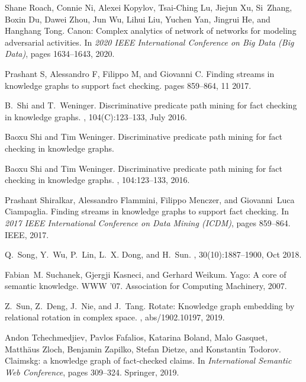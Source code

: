 \documentclass[11pt]{article}
\begin{document}
\begin{thebibliography}{10}
Shane Roach, Connie Ni, Alexei Kopylov, Tsai-Ching Lu, Jiejun Xu, Si~Zhang,
  Boxin Du, Dawei Zhou, Jun Wu, Lihui Liu, Yuchen Yan, Jingrui He, and Hanghang
  Tong.
\newblock Canon: Complex analytics of network of networks for modeling
  adversarial activities.
\newblock In {\em 2020 IEEE International Conference on Big Data (Big Data)},
  pages 1634--1643, 2020.

Prashant S, Alessandro F, Filippo M, and Giovanni C.
\newblock Finding streams in knowledge graphs to support fact checking.
\newblock pages 859--864, 11 2017.

B.~Shi and T.~Weninger.
\newblock Discriminative predicate path mining for fact checking in knowledge
  graphs.
, 104(C):123--133, July 2016.

Baoxu Shi and Tim Weninger.
\newblock Discriminative predicate path mining for fact checking in knowledge
  graphs.

Baoxu Shi and Tim Weninger.
\newblock Discriminative predicate path mining for fact checking in knowledge
  graphs.
, 104:123--133, 2016.

Prashant Shiralkar, Alessandro Flammini, Filippo Menczer, and Giovanni~Luca
  Ciampaglia.
\newblock Finding streams in knowledge graphs to support fact checking.
\newblock In {\em 2017 IEEE International Conference on Data Mining (ICDM)},
  pages 859--864. IEEE, 2017.

Q.~{Song}, Y.~{Wu}, P.~{Lin}, L.~X. {Dong}, and H.~{Sun}.
,
  30(10):1887--1900, Oct 2018.

Fabian~M. Suchanek, Gjergji Kasneci, and Gerhard Weikum.
\newblock Yago: A core of semantic knowledge.
\newblock WWW ’07. Association for Computing Machinery, 2007.

Z.~Sun, Z.~Deng, J.~Nie, and J.~Tang.
\newblock Rotate: Knowledge graph embedding by relational rotation in complex
  space.
, abs/1902.10197, 2019.

Andon Tchechmedjiev, Pavlos Fafalios, Katarina Boland, Malo Gasquet,
  Matth{\"a}us Zloch, Benjamin Zapilko, Stefan Dietze, and Konstantin Todorov.
\newblock Claimskg: a knowledge graph of fact-checked claims.
\newblock In {\em International Semantic Web Conference}, pages 309--324.
  Springer, 2019.


\end{thebibliography}
\end{document}
